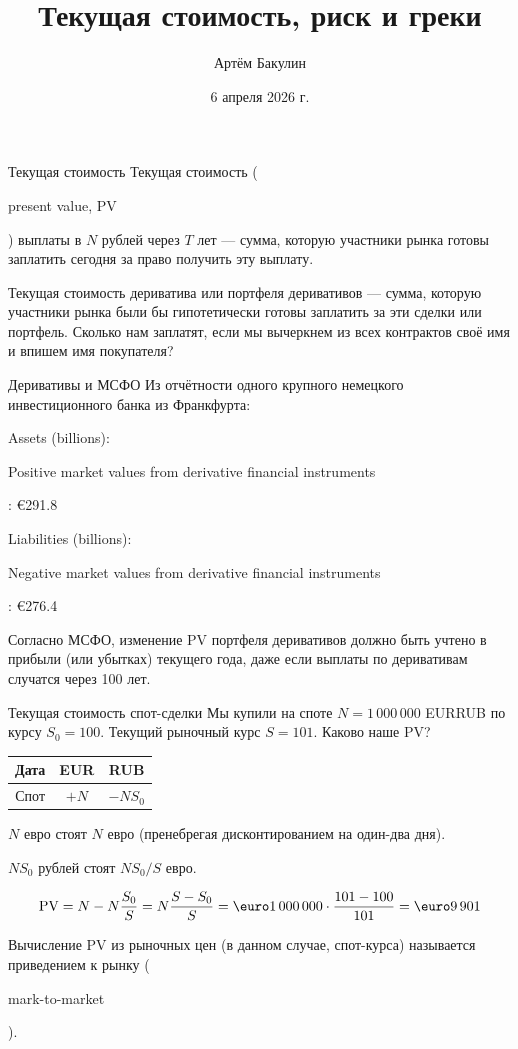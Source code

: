 \documentclass{beamer}
\title{Текущая стоимость, риск и греки}
\author{Артём Бакулин}
\date{6 апреля 2026 г.}
\renewcommand{\EUR}[1]{\textup{\euro}#1}
\newcommand{\en}[1]{\begin{otherlanguage}{english}#1\end{otherlanguage}}
\begin{document}
\begin{frame}
\titlepage
\end{frame}



\begin{frame}{Текущая стоимость}
\justify
\alert{Текущая стоимость} (\en{present value, PV}) выплаты в $N$ рублей через $T$ лет 
--- сумма, которую участники рынка готовы заплатить сегодня за право получить эту 
выплату.

\justify
Текущая стоимость дериватива или портфеля деривативов --- сумма, которую участники рынка были бы гипотетически готовы заплатить за эти сделки или портфель. Сколько нам заплатят, если мы вычеркнем из всех контрактов своё имя и впишем имя покупателя?

\end{frame}



\begin{frame}{Деривативы и МСФО}
\justify
Из отчётности одного крупного немецкого инвестиционного банка из Франкфурта:

\justify
Assets (billions):

\en{Positive market values from derivative financial instruments}: \EUR{291.8}

\justify
Liabilities (billions):

\en{Negative market values from derivative financial instruments}: \EUR{276.4}

\justify
Согласно МСФО, изменение PV портфеля деривативов должно быть учтено в прибыли (или убытках) текущего года, даже если выплаты по деривативам случатся через 100 лет.
\end{frame}



\begin{frame}{Текущая стоимость спот-сделки}
\justify
Мы купили на споте $N=1\,000\,000$ EURRUB по курсу $S_0 = 100$. Текущий рыночный курс $S=101$. Каково наше PV?

\justify
\centering
\begin{tabular}{c|c|c}
Дата & EUR  & RUB \\ \hline
Спот & $+N$ & $-NS_0$
\end{tabular}

\justify
$N$ евро стоят $N$ евро (пренебрегая дисконтированием на один-два дня).

\justify
$NS_0$ рублей стоят $NS_0/S$ евро.

\begin{align*}
\text{PV} = N - N\frac{S_0}{S} = N\frac{S - S_0}{S} = \EUR{1\,000\,000} \cdot \frac{101 - 100}{101} = \EUR{9\,901}
\end{align*}

\justify
Вычисление PV из рыночных цен (в данном случае, спот-курса) называется \alert{приведением к рынку} (\en{mark-to-market}).
\end{frame}
\end{document}
